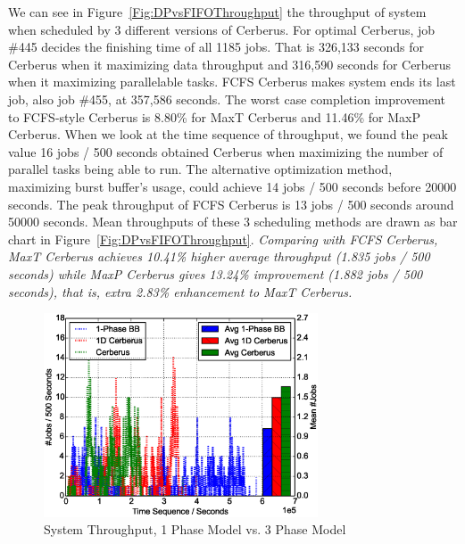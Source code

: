 We can see in Figure~\ref{Fig:DPvsFIFOThroughput} the throughput of system
when scheduled by 3 different versions of Cerberus.
For optimal Cerberus, job \#445 decides the finishing time of all 1185 jobs.
That is 326,133 seconds for Cerberus when it maximizing data throughput
and 316,590 seconds for Cerberus when it maximizing parallelable tasks.
FCFS Cerberus makes system ends its last job, also job \#455, at 357,586 seconds.
The worst case completion improvement to FCFS-style Cerberus is
8.80\% for MaxT Cerberus and 11.46\% for MaxP Cerberus.
When we look at the time sequence of throughput,
we found the peak value 16 jobs / 500 seconds obtained Cerberus
when maximizing the number of parallel tasks being able to run.
The alternative optimization method, maximizing burst buffer's usage,
could achieve 14 jobs / 500 seconds before 20000 seconds.
The peak throughput of FCFS Cerberus is 13 jobs / 500 seconds around 50000 seconds.
Mean throughputs of these 3 scheduling methods are drawn
as bar chart in Figure~\ref{Fig:DPvsFIFOThroughput}.
\textit{Comparing with FCFS Cerberus, MaxT Cerberus achieves
10.41\% higher average throughput (1.835 jobs / 500 seconds)
while MaxP Cerberus gives 13.24\% improvement (1.882 jobs / 500 seconds),
that is, extra 2.83\% enhancement to MaxT Cerberus.}

\begin{figure}[!t]
        \centering
        \includegraphics[width=3.2in]{Draw3Pvs1P/1000jobs_3p_vs_1p_throughput}
        \caption{System Throughput, 1 Phase Model vs. 3 Phase Model}
        \label{Fig:3Pvs1PThroughput}
\end{figure}

